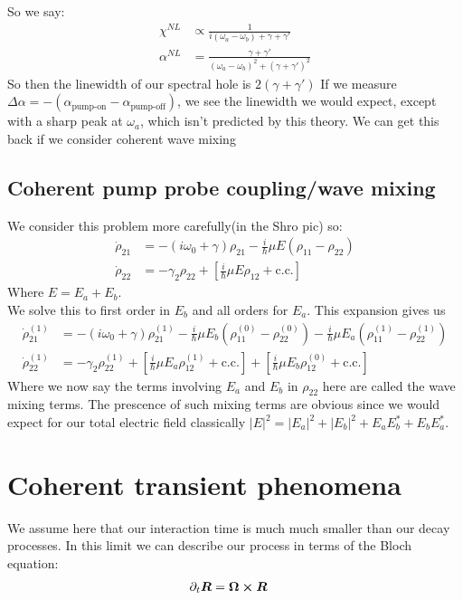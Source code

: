 So we say:
\begin{align*}
	\chi^{NL} &\propto \frac{1}{i(\omega_a - \omega_b) + \gamma + \gamma'} \\
	\alpha^{NL} &= \frac{\gamma + \gamma'}{(\omega_a - \omega_b)^2 + (\gamma + \gamma')^2}
\end{align*}
So then the linewidth of our spectral hole is $2(\gamma + \gamma')$ If we measure $\Delta\alpha = -(\alpha_\text{pump-on} - \alpha_\text{pump-off})$, we see the linewidth we would expect, except with a sharp peak at $\omega_a$, which isn't predicted by this theory.
We can get this back if we consider coherent wave mixing
\subsection{Coherent pump probe coupling/wave mixing}
We consider this problem more carefully(in the Shro pic) so:
\begin{align*}
	\dot{\rho}_{21} &= -\left(i\omega_0 + \gamma\right)\rho_{21} - \frac{i}{\hbar} \mu E(\rho_{11} - \rho_{22}) \\
	\dot{\rho}_{22} &= -\gamma_2\rho_{22} + \left[ \frac{i}{\hbar}\mu E \rho_{12} + \text{c.c.}\right] 
\end{align*}
Where $E = E_a + E_b$. \\
We solve this to first order in $E_b$ and all orders for $E_a$. This expansion gives us
\begin{align*}
	\dot{\rho}_{21}^{(1)} &= -\left(i\omega_0 + \gamma\right)\rho_{21}^{(1)} - \frac{i}{\hbar} \mu E_b(\rho_{11}^{(0)} - \rho_{22}^{(0)}) - \frac{i}{\hbar} \mu E_a(\rho_{11}^{(1)} - \rho_{22}^{(1)}) \\
	\dot{\rho}_{22}^{(1)} &= -\gamma_2\rho_{22}^{(1)} + \left[ \frac{i}{\hbar}\mu E_a \rho_{12}^{(1)} + \text{c.c.}\right] + \left[ \frac{i}{\hbar}\mu E_b \rho_{12}^{(0)} + \text{c.c.}\right] 
\end{align*}
Where we now say the terms involving $E_a$ and $E_b$ in $\rho_{22}$ here are called the wave mixing terms. The prescence of such mixing terms are obvious since we would expect for our total electric field classically $|E|^2 = |E_a|^2 + |E_b|^2 + E_aE_b^* + E_bE_a^*$.
\section{Coherent transient phenomena}
We assume here that our interaction time is much much smaller than our decay processes. In this limit we can describe our process in terms of the Bloch equation:
\begin{align*}
	\partial_t \bm{R} &= \bm{\Omega}\cross\bm{R}
\end{align*}
